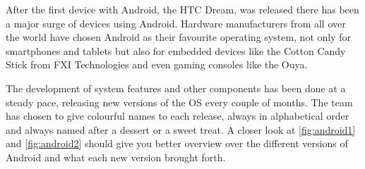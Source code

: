 After the first device with Android, the HTC Dream, was released there has been a major surge of devices using Android. Hardware manufacturers from all over the world have chosen Android as their favourite operating system, not only for smartphones and tablets but also for embedded devices like the Cotton Candy Stick from FXI Technologies and even gaming consoles like the Ouya. %


The development of system features and other components has been done at a steady pace, releasing new versions of the OS every couple of months. The team has chosen to give colourful names to each release, always in alphabetical order and always named after a dessert or a sweet treat. A closer look at \autoref{fig:android1} and \autoref{fig:android2} should give you  better overview over the different versions of Android and what each new version brought forth.   

